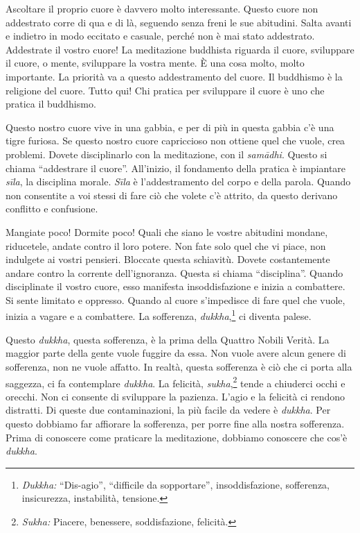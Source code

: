 Ascoltare il proprio cuore è davvero molto interessante. Questo cuore
non addestrato corre di qua e di là, seguendo senza freni le sue
abitudini. Salta avanti e indietro in modo eccitato e casuale, perché
non è mai stato addestrato. Addestrate il vostro cuore! La meditazione
buddhista riguarda il cuore, sviluppare il cuore, o mente, sviluppare la
vostra mente. È una cosa molto, molto importante. La priorità va a
questo addestramento del cuore. Il buddhismo è la religione del cuore.
Tutto qui! Chi pratica per sviluppare il cuore è uno che pratica il
buddhismo.

Questo nostro cuore vive in una gabbia, e per di più in questa gabbia
c'è una tigre furiosa. Se questo nostro cuore capriccioso non ottiene
quel che vuole, crea problemi. Dovete disciplinarlo con la meditazione,
con il \emph{samādhi}. Questo si chiama ``addestrare il cuore''.
All'inizio, il fondamento della pratica è impiantare \emph{sīla}, la
disciplina morale. \emph{Sīla} è l'addestramento del corpo e della
parola. Quando non consentite a voi stessi di fare ciò che volete c'è
attrito, da questo derivano conflitto e confusione.

Mangiate poco! Dormite poco! Quali che siano le vostre abitudini
mondane, riducetele, andate contro il loro potere. Non fate solo quel
che vi piace, non indulgete ai vostri pensieri. Bloccate questa
schiavitù. Dovete costantemente andare contro la corrente
dell'ignoranza. Questa si chiama ``disciplina''. Quando disciplinate il
vostro cuore, esso manifesta insoddisfazione e inizia a combattere. Si
sente limitato e oppresso. Quando al cuore s'impedisce di fare quel che
vuole, inizia a vagare e a combattere. La sofferenza,
\emph{dukkha},\footnote{\emph{Dukkha:} ``Dis-agio'', ``difficile da
  sopportare'', insoddisfazione, sofferenza, insicurezza, instabilità,
  tensione.} ci diventa palese.

Questo \emph{dukkha}, questa sofferenza, è la prima della Quattro Nobili
Verità. La maggior parte della gente vuole fuggire da essa. Non vuole
avere alcun genere di sofferenza, non ne vuole affatto. In realtà,
questa sofferenza è ciò che ci porta alla saggezza, ci fa contemplare
\emph{dukkha}. La felicità, \emph{sukha},\footnote{\emph{Sukha:}
  Piacere, benessere, soddisfazione, felicità.} tende a chiuderci occhi
e orecchi. Non ci consente di sviluppare la pazienza. L'agio e la
felicità ci rendono distratti. Di queste due contaminazioni, la più
facile da vedere è \emph{dukkha}. Per questo dobbiamo far affiorare la
sofferenza, per porre fine alla nostra sofferenza. Prima di conoscere
come praticare la meditazione, dobbiamo conoscere che cos'è
\emph{dukkha}.

